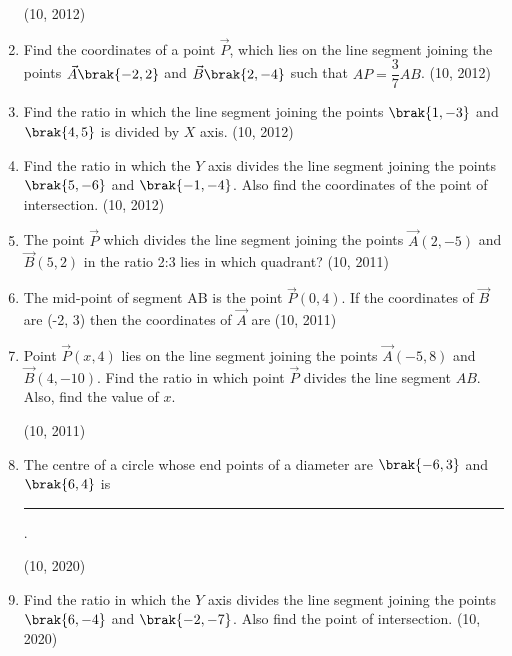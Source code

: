 \begin{enumerate}[label=\thesubsection.\arabic*,ref=\thesubsection.\theenumi]
\hfill (10, 2012)
\item Find the coordinates of a point $\vec{P}$, which lies on the line segment joining the points $\vec{A}\brak{-2,2}$ and $\vec{B}\brak{2,-4}$ such that $AP = \dfrac{3}{7} AB$. 
\hfill (10, 2012)
\item Find the ratio in which the line segment joining the points $\brak{1,-3}$ and $\brak{4,5}$ is divided by $X$ axis. 
\hfill (10, 2012)
\item Find the ratio in which the $Y$ axis divides the line segment joining the points $\brak{5,-6}$ and $\brak{-1,-4}$. Also find the coordinates of the point of intersection. 
\hfill (10, 2012)
    \item The point $\vec{P}$ which divides the line segment joining the points $\vec{A}(2, - 5)$ and $\vec{B}(5, 2)$ in the ratio 2:3 lies in which quadrant?
\hfill (10, 2011)
    \item The mid-point of segment AB is the point $\vec{P}( 0, 4)$. If the coordinates of $\vec{B}$ are (-2, 3) then the coordinates of $\vec{A}$ are
\hfill (10, 2011)
\item Point $\vec{P}(x, 4)$ lies on the line segment joining the points $\vec{A} (-5,8)$ and $\vec{B} (4, -10)$. Find the ratio in which point $\vec{P}$ divides the line segment $AB$. Also, find the value of $x$.

\hfill (10, 2011)
\item The centre of a circle whose end points of a diameter are $\brak{-6,3}$ and $\brak{6,4}$ is
\rule{1cm}{0.2pt}.

\hfill (10, 2020)
\item Find the ratio in which the $Y$ axis divides the line segment joining the points $\brak{6,-4}$ and $\brak{-2, -7}$. Also find the point of intersection.
\hfill (10, 2020)
\end{enumerate}
